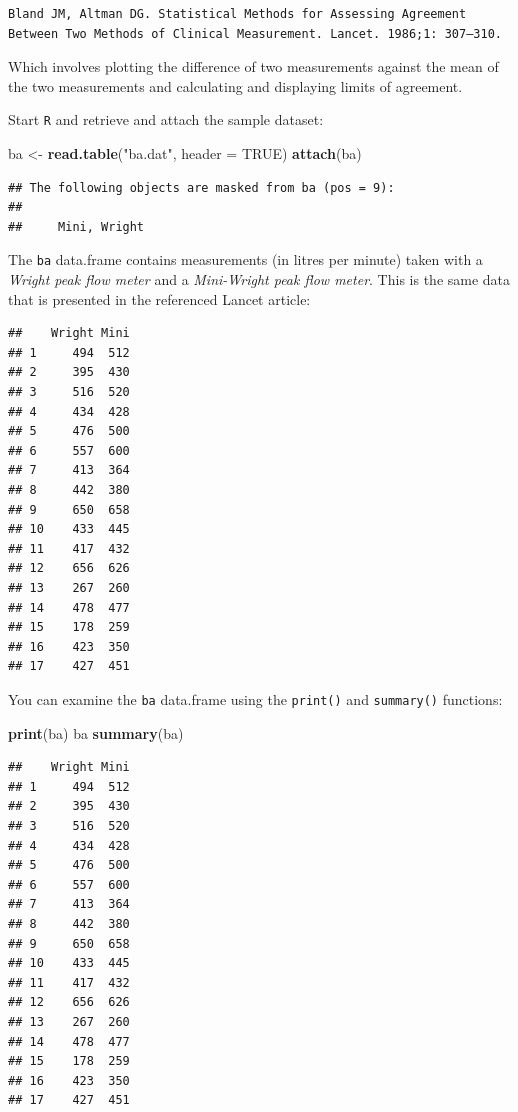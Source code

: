 \documentclass[12pt,]{book}
\newenvironment{Shaded}{\begin{snugshade}}{\end{snugshade}}
\newcommand{\KeywordTok}[1]{\textcolor[rgb]{0.13,0.29,0.53}{\textbf{#1}}}
\newcommand{\DataTypeTok}[1]{\textcolor[rgb]{0.13,0.29,0.53}{#1}}
\newcommand{\StringTok}[1]{\textcolor[rgb]{0.31,0.60,0.02}{#1}}
\newcommand{\OtherTok}[1]{\textcolor[rgb]{0.56,0.35,0.01}{#1}}
\newcommand{\NormalTok}[1]{#1}
\theoremstyle{definition}
\theoremstyle{definition}
\theoremstyle{definition}
\theoremstyle{remark}
\begin{document}
\begin{verbatim}
Bland JM, Altman DG. Statistical Methods for Assessing Agreement Between Two Methods of Clinical Measurement. Lancet. 1986;1: 307–310. 
\end{verbatim}

Which involves plotting the difference of two measurements against the
mean of the two measurements and calculating and displaying limits of
agreement.

Start \texttt{R} and retrieve and attach the sample dataset:

\begin{Shaded}
\begin{Highlighting}[]
\NormalTok{ba <-}\StringTok{ }\KeywordTok{read.table}\NormalTok{(}\StringTok{"ba.dat"}\NormalTok{, }\DataTypeTok{header =} \OtherTok{TRUE}\NormalTok{)}
\KeywordTok{attach}\NormalTok{(ba)}
\end{Highlighting}
\end{Shaded}

\begin{verbatim}
## The following objects are masked from ba (pos = 9):
## 
##     Mini, Wright
\end{verbatim}

The \texttt{ba} data.frame contains measurements (in litres per minute)
taken with a \emph{Wright peak flow meter} and a \emph{Mini-Wright peak
flow meter}. This is the same data that is presented in the referenced
Lancet article:

\begin{verbatim}
##    Wright Mini
## 1     494  512
## 2     395  430
## 3     516  520
## 4     434  428
## 5     476  500
## 6     557  600
## 7     413  364
## 8     442  380
## 9     650  658
## 10    433  445
## 11    417  432
## 12    656  626
## 13    267  260
## 14    478  477
## 15    178  259
## 16    423  350
## 17    427  451
\end{verbatim}

You can examine the \texttt{ba} data.frame using the \texttt{print()}
and \texttt{summary()} functions:

\begin{Shaded}
\begin{Highlighting}[]
\KeywordTok{print}\NormalTok{(ba)}
\NormalTok{ba}
\KeywordTok{summary}\NormalTok{(ba)}
\end{Highlighting}
\end{Shaded}

\begin{verbatim}
##    Wright Mini
## 1     494  512
## 2     395  430
## 3     516  520
## 4     434  428
## 5     476  500
## 6     557  600
## 7     413  364
## 8     442  380
## 9     650  658
## 10    433  445
## 11    417  432
## 12    656  626
## 13    267  260
## 14    478  477
## 15    178  259
## 16    423  350
## 17    427  451
\end{verbatim}
\end{document}
